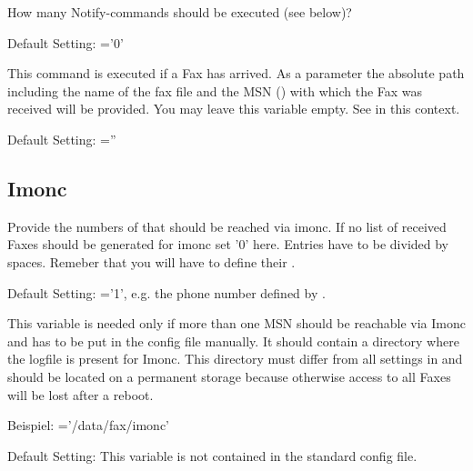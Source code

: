 \begin {description}


    {How many Notify-commands should be executed (see below)?

        Default Setting: ='0'}


    {This command is executed if a Fax has arrived. As a parameter
    the absolute path including the name of the fax file and the
    MSN () with which the Fax was received will
    be provided. You may leave this variable empty. See
    in this context.

        Default Setting: =''}

\end {description}

\subsection{Imonc}

\begin {description}


    {Provide the numbers of  that should be reached via imonc.
    If no list of received Faxes should be generated for imonc set '0' here.
    Entries have to be divided by spaces. Remeber that you will have to define
    their .

        Default Setting:
            ='1', e.g. the phone number
                defined by .}


    {This variable is needed only if more than one MSN should be reachable via
    Imonc and has to be put in the config file manually.
    It should contain a directory where the logfile is present for Imonc.
    This directory must differ from all settings in 
    and should be located on a permanent storage because otherwise access to all
    Faxes will be lost after a reboot.

        Beispiel:
            ='/data/fax/imonc'

        Default Setting:
            This variable is not contained in the standard config file.}

\end{description}

